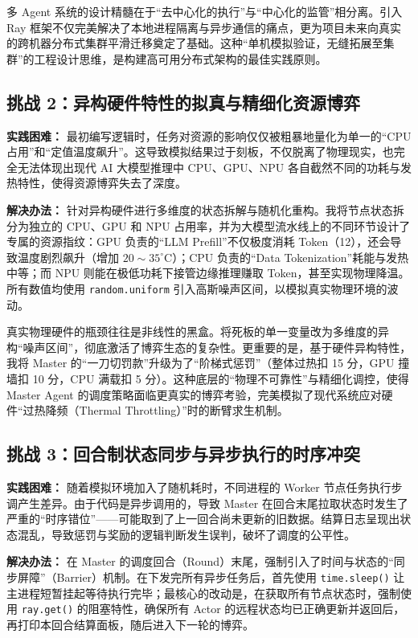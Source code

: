 \documentclass[11pt,a4paper]{ctexart}
\begin{document}
\begin{tcolorbox}[reflectionbox]
多 Agent 系统的设计精髓在于“去中心化的执行”与“中心化的监管”相分离。引入 Ray 框架不仅完美解决了本地进程隔离与异步通信的痛点，更为项目未来向真实的跨机器分布式集群平滑迁移奠定了基础。这种“单机模拟验证，无缝拓展至集群”的工程设计思维，是构建高可用分布式架构的最佳实践原则。
\end{tcolorbox}

\subsection{挑战 2：异构硬件特性的拟真与精细化资源博弈}
\textbf{实践困难：} 最初编写逻辑时，任务对资源的影响仅仅被粗暴地量化为单一的“CPU 占用”和“定值温度飙升”。这导致模拟结果过于刻板，不仅脱离了物理现实，也完全无法体现出现代 AI 大模型推理中 CPU、GPU、NPU 各自截然不同的功耗与发热特性，使得资源博弈失去了深度。

\textbf{解决办法：} 针对异构硬件进行多维度的状态拆解与随机化重构。我将节点状态拆分为独立的 CPU、GPU 和 NPU 占用率，并为大模型流水线上的不同环节设计了专属的资源指纹：GPU 负责的“LLM Prefill”不仅极度消耗 Token（12），还会导致温度剧烈飙升（增加 $20 \sim 35^\circ\text{C}$）；CPU 负责的“Data Tokenization”耗能与发热中等；而 NPU 则能在极低功耗下接管边缘推理赚取 Token，甚至实现物理降温。所有数值均使用 \texttt{random.uniform} 引入高斯噪声区间，以模拟真实物理环境的波动。

\begin{tcolorbox}[reflectionbox]
真实物理硬件的瓶颈往往是非线性的黑盒。将死板的单一变量改为多维度的异构“噪声区间”，彻底激活了博弈生态的复杂性。更重要的是，基于硬件异构特性，我将 Master 的“一刀切罚款”升级为了“阶梯式惩罚”（整体过热扣 15 分，GPU 撞墙扣 10 分，CPU 满载扣 5 分）。这种底层的“物理不可靠性”与精细化调控，使得 Master Agent 的调度策略面临更真实的博弈考验，完美模拟了现代系统应对硬件“过热降频（Thermal Throttling）”时的断臂求生机制。
\end{tcolorbox}

\subsection{挑战 3：回合制状态同步与异步执行的时序冲突}
\textbf{实践困难：} 随着模拟环境加入了随机耗时，不同进程的 Worker 节点任务执行步调产生差异。由于代码是异步调用的，导致 Master 在回合末尾拉取状态时发生了严重的“时序错位”——可能取到了上一回合尚未更新的旧数据。结算日志呈现出状态混乱，导致惩罚与奖励的逻辑判断发生误判，破坏了调度的公平性。

\textbf{解决办法：} 在 Master 的调度回合（Round）末尾，强制引入了时间与状态的“同步屏障”（Barrier）机制。在下发完所有异步任务后，首先使用 \texttt{time.sleep()} 让主进程短暂挂起等待执行完毕；最核心的改动是，在获取所有节点状态时，强制使用 \texttt{ray.get()} 的阻塞特性，确保所有 Actor 的远程状态均已正确更新并返回后，再打印本回合结算面板，随后进入下一轮的博弈。
\end{document}
